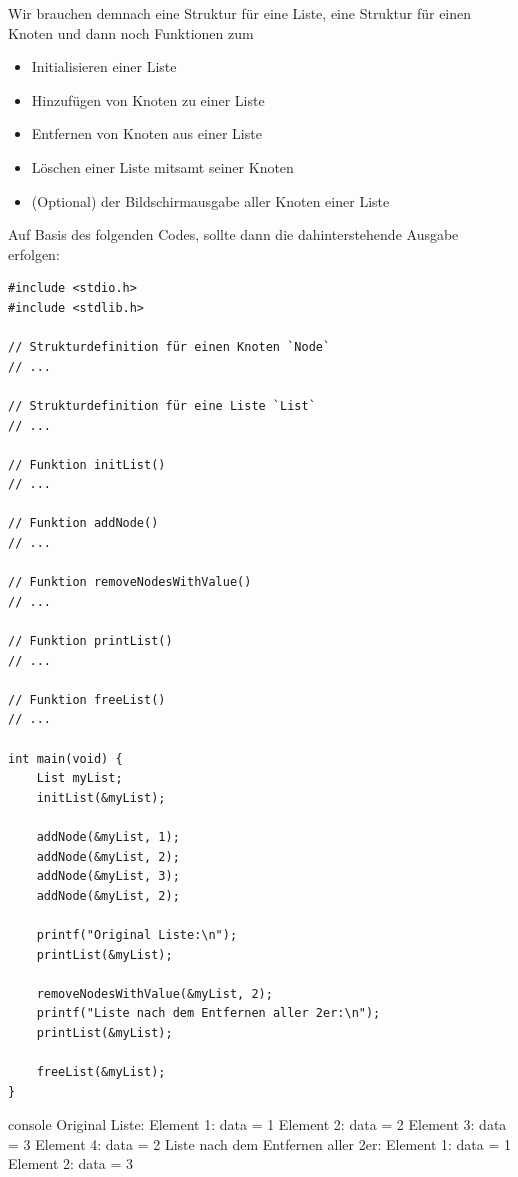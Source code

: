 Wir brauchen demnach eine Struktur für eine Liste, eine Struktur für einen
Knoten und dann noch Funktionen zum
\begin{itemize}
    \item Initialisieren einer Liste
    \item Hinzufügen von Knoten zu einer Liste
    \item Entfernen von Knoten aus einer Liste
    \item Löschen einer Liste mitsamt seiner Knoten
    \item (Optional) der Bildschirmausgabe aller Knoten einer Liste
\end{itemize}

Auf Basis des folgenden Codes, sollte dann die dahinterstehende Ausgabe
erfolgen:

\begin{verbatim}
#include <stdio.h>
#include <stdlib.h>

// Strukturdefinition für einen Knoten `Node`
// ...

// Strukturdefinition für eine Liste `List`
// ...

// Funktion initList()
// ...

// Funktion addNode()
// ...

// Funktion removeNodesWithValue()
// ...

// Funktion printList()
// ...

// Funktion freeList()
// ...

int main(void) {
    List myList;
    initList(&myList);

    addNode(&myList, 1);
    addNode(&myList, 2);
    addNode(&myList, 3);
    addNode(&myList, 2);

    printf("Original Liste:\n");
    printList(&myList);

    removeNodesWithValue(&myList, 2);
    printf("Liste nach dem Entfernen aller 2er:\n");
    printList(&myList);

    freeList(&myList);
}
\end{verbatim}

\begin{mybox}[Bildschirmausgabe]{console}
Original Liste:
Element 1: data = 1
Element 2: data = 2
Element 3: data = 3
Element 4: data = 2
Liste nach dem Entfernen aller 2er:
Element 1: data = 1
Element 2: data = 3
\end{mybox}


